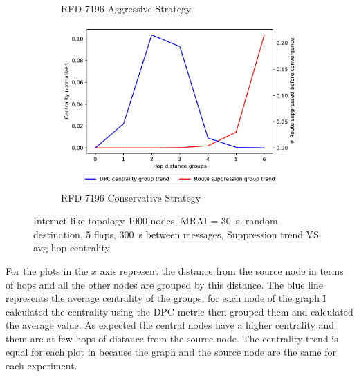 \begin{figure}[h]
\begin{subfigure}[b]{0.325\textwidth}
         \caption{RFD 7196 Aggressive Strategy}
         \label{fig:1000_7196RFDA_centVSsup}
     \end{subfigure}
     \hfill
     \begin{subfigure}[b]{0.325\textwidth}
         \centering
         \includegraphics[width=\textwidth]{images/RFD/miceVSelephants/mice/cisco_1000_RFD_7196_conservative_nodeConvergence_centVSsup_trend.pdf}
         \caption{RFD 7196 Conservative Strategy}
         \label{fig:1000_7196RFDC_centVSsup}
     \end{subfigure}
		\caption{Internet like topology \num{1000} nodes, \ac{MRAI} = \SI{30}{\second}, random destination, \num{5} flaps, \SI{300}{\second} between messages, Suppression trend VS avg hop centrality}
        \label{fig:1000_RFD_centVSsup}
\end{figure}


For the plots in  the $x$ axis represent the distance
from the source node in terms of hops and all the other nodes are grouped by this
distance.
The blue line represents the average centrality of the groups, for each node of the
graph I calculated the centrality using the \ac{DPC} metric then grouped them
and calculated the average value.
As expected the central nodes have a higher centrality and them are at few hops
of distance
from the source node.
The centrality trend is equal for each plot in 
because the graph and the source node are the same for each experiment.

